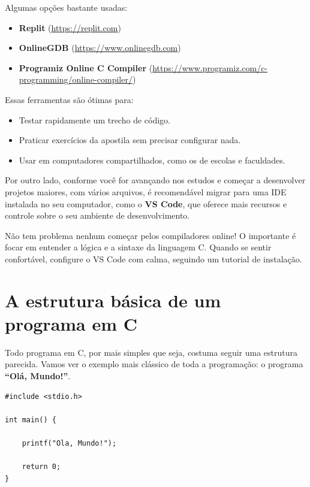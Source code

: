Algumas opções bastante usadas:

\begin{itemize}
    \item \textbf{Replit} (\url{https://replit.com})
    \item \textbf{OnlineGDB} (\url{https://www.onlinegdb.com})
    \item \textbf{Programiz Online C Compiler} (\url{https://www.programiz.com/c-programming/online-compiler/})
\end{itemize}

Essas ferramentas são ótimas para:

\begin{itemize}
    \item Testar rapidamente um trecho de código.
    \item Praticar exercícios da apostila sem precisar configurar nada.
    \item Usar em computadores compartilhados, como os de escolas e faculdades.
\end{itemize}

Por outro lado, conforme você for avançando nos estudos e começar a desenvolver projetos maiores, com vários arquivos, é recomendável migrar para uma IDE instalada no seu computador, como o \textbf{VS Code}, que oferece mais recursos e controle sobre o seu ambiente de desenvolvimento.

\begin{dica}[Dica]
Não tem problema nenhum começar pelos compiladores online! O importante é focar em entender a lógica e a sintaxe da linguagem C. Quando se sentir confortável, configure o VS Code com calma, seguindo um tutorial de instalação.
\end{dica}

\section{\textcolor{azulPrincipal}{A estrutura básica de um programa em C}}

Todo programa em C, por mais simples que seja, costuma seguir uma estrutura parecida. Vamos ver o exemplo mais clássico de toda a programação: o programa \textbf{``Olá, Mundo!''}.

\begin{lstlisting}[style=codigoC]
#include <stdio.h>

int main() {

    printf("Ola, Mundo!");

    return 0;
}
\end{lstlisting}

